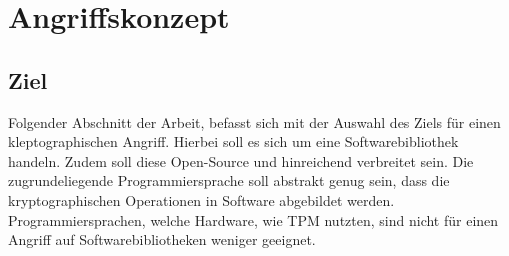 \chapter{Angriffskonzept}

    \section{Ziel}
        Folgender Abschnitt der Arbeit, befasst sich mit der Auswahl des Ziels für einen kleptographischen Angriff. Hierbei soll es sich um eine Softwarebibliothek handeln. Zudem soll diese Open-Source und hinreichend verbreitet sein. Die zugrundeliegende Programmiersprache soll abstrakt genug sein, dass die kryptographischen Operationen in Software abgebildet werden. Programmiersprachen, welche Hardware, wie \ac{TPM} nutzten, sind nicht für einen Angriff auf Softwarebibliotheken weniger geeignet.
